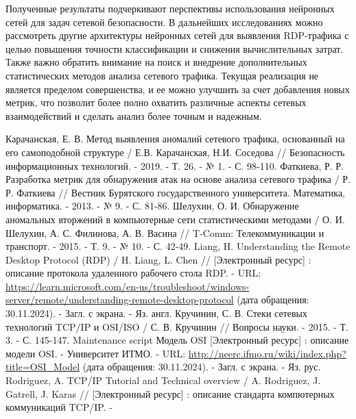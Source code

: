 \documentclass[spec, och, diploma]{SCWorks}
\begin{document}
Полученные результаты подчеркивают перспективы использования нейронных сетей для задач сетевой безопасности. 
В дальнейших исследованиях можно рассмотреть другие архитектуры нейронных сетей для выявления RDP-трафика с целью повышения точности 
классификации и снижения вычислительных затрат. Также важно обратить внимание на поиск и внедрение дополнительных статистических методов анализа 
сетевого трафика. Текущая реализация не является пределом совершенства, и ее можно улучшить за счет добавления новых метрик, что позволит более полно 
охватить различные аспекты сетевых взаимодействий и сделать анализ более точным и надежным.

\begin{thebibliography}{25}
    Карачанская, Е. В. Метод выявления аномалий сетевого трафика, основанный на его самоподобной структуре / Е.В. Карачанская, Н.И. Соседова // 
    Безопасность информационных технологий. - 2019. - Т. 26. - № 1. - С. 98-110.
    Фаткиева, Р. Р. Разработка метрик для обнаружения атак на основе анализа сетевого трафика / Р. Р. Фаткиева // Вестник Бурятского государственного университета. 
    Математика, информатика. - 2013. - № 9. - С. 81-86.
    Шелухин, О. И. Обнаружение аномальных вторжений в компьютерные сети статистическими методами / О. И. Шелухин, А. С. Филинова, А. В. Васина // T-Comm: 
    Телекоммуникации и транспорт. - 2015. - Т. 9. - № 10. - С. 42-49.
    Liang, H. Understanding the Remote Desktop Protocol (RDP) / H. Liang, L. Chen // [Электронный ресурс] : описание протокола удаленного рабочего стола RDP. - 
    URL: \url{https://learn.microsoft.com/en-us/troubleshoot/windows-server/remote/understanding-remote-desktop-protocol} (дата обращения: 30.11.2024). - Загл. с экрана. - Яз. англ.
    Кручинин, С. В. Стеки сетевых технологий TCP/IP и OSI/ISO / С. В. Кручинин // Вопросы науки. - 2015. - Т. 3. - С. 145-147.
    Maintenance script Модель OSI [Электронный ресурс] : описание модели OSI. - Университет ИТМО. - URL: \url{http://neerc.ifmo.ru/wiki/index.php?title=OSI_Model}
    (дата обращения: 30.11.2024). - Загл. с экрана. - Яз. рус.
    Rodriguez, A. TCP/IP Tutorial and Technical overview / A. Rodriguez, J. Gatrell, J. Karas // [Электронный ресурс] : описание стандарта компютерных коммуникаций TCP/IP. -

\end{thebibliography}
\end{document}
